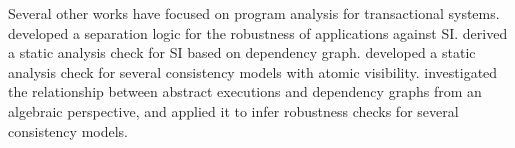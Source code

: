 Several other works have focused on program analysis for transactional systems. 
 developed a separation logic for
the robustness of applications against SI.  derived 
a static analysis check for SI based on dependency graph. 
developed a static analysis check for several consistency models with atomic visibility. 
 investigated the relationship between abstract 
executions and dependency graphs from an algebraic perspective, and applied it to infer 
robustness checks for several consistency models. 

